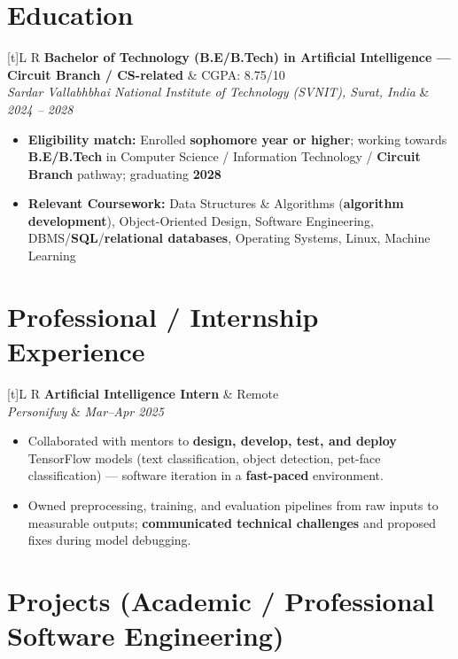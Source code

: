 \documentclass[a4paper,10pt]{article}
\newcommand{\resumeSubheading}[4]{%
  \vspace{0.5mm}
  \noindent
  \begin{tabularx}{\textwidth}[t]{L R}
    \textbf{#1} & #4 \\
    \textit{#3} & \textit{#2} \\
  \end{tabularx}
  \vspace{-0.2mm}%
}
\begin{document}
\section{Education}
\small
\resumeSubheading
  {Bachelor of Technology (B.E/B.Tech) in Artificial Intelligence --- Circuit Branch / CS-related}{2024 -- 2028}
  {Sardar Vallabhbhai National Institute of Technology (SVNIT), Surat, India}{CGPA: 8.75/10}
\begin{itemize}
  \item \textbf{Eligibility match:} Enrolled \textbf{sophomore year or higher}; working towards \textbf{B.E/B.Tech} in Computer Science / Information Technology / \textbf{Circuit Branch} pathway; graduating \textbf{2028}
  \item \textbf{Relevant Coursework:} Data Structures \& Algorithms (\textbf{algorithm development}), Object-Oriented Design, Software Engineering, DBMS/\textbf{SQL}/\textbf{relational databases}, Operating Systems, Linux, Machine Learning
\end{itemize}

\section{Professional / Internship Experience}
\small
\resumeSubheading
  {Artificial Intelligence Intern}{Mar--Apr 2025}
  {Personifwy}{Remote}
\begin{itemize}
  \item Collaborated with mentors to \textbf{design, develop, test, and deploy} TensorFlow models (text classification, object detection, pet-face classification) --- software iteration in a \textbf{fast-paced} environment.
  \item Owned preprocessing, training, and evaluation pipelines from raw inputs to measurable outputs; \textbf{communicated technical challenges} and proposed fixes during model debugging.
\end{itemize}

\section{Projects (Academic / Professional Software Engineering)}
\small
\end{document}
